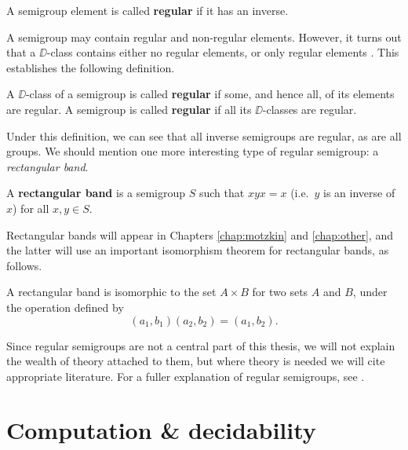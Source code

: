 \begin{definition}
  \label{def:regular-element}
  A semigroup element is called \textbf{regular} if it has an inverse.
\end{definition}

A semigroup may contain regular and non-regular elements.  However, it turns out
that a $\DD$-class contains either no regular elements, or only regular elements
\cite[Proposition 2.3.1]{howie}.  This establishes the following definition.

\begin{definition}
  \label{def:regular-semigroup}
  A $\DD$-class of a semigroup is called \textbf{regular} if some, and hence
  all, of its elements are regular.  A semigroup is called \textbf{regular} if
  all its $\DD$-classes are regular.
\end{definition}

Under this definition, we can see that all inverse semigroups are regular, as
are all groups.  We should mention one more interesting type of regular
semigroup: a \textit{rectangular band}.

\begin{definition}
  \label{def:rectangular-band}
  A \textbf{rectangular band} is a semigroup $S$ such that $xyx=x$ (i.e.~$y$ is
  an inverse of $x$) for all $x,y \in S$.
\end{definition}

Rectangular bands will appear in Chapters \ref{chap:motzkin} and
\ref{chap:other}, and the latter will use an important isomorphism theorem for
rectangular bands, as follows.

\begin{theorem}
  \label{thm:rectangular-band}
  A rectangular band is isomorphic to the set $A \times B$ for two sets $A$ and
  $B$, under the operation defined by
  $$(a_1, b_1) (a_2, b_2) = (a_1, b_2).$$
\end{theorem}

Since regular semigroups are not a central part of this thesis,
we will not explain the wealth of theory attached to them, but where theory is
needed we will cite appropriate literature.  For a fuller explanation of regular
semigroups, see \cite[\S2.4]{howie}.

\section{Computation \& decidability}
\label{sec:computation-decidability}

